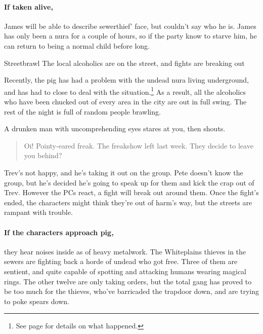 \begin{multicols}{2}

\paragraph{If taken alive,}
James will be able to describe \gls{sewerthief}' face, but couldn't say who he is.
James has only been a nura for a couple of hours, so if the party know to starve him, he can return to being a normal child before long.

{\N Streetbrawl}%
{The local alcoholics are on the street, and fights are breaking out}%

Recently, the \gls{pig} has had a problem with the undead nura living underground, and has had to close to deal with the situation.\footnote{See page \pageref{pig_pantry} for details on what happened.}
As a result, all the alcoholics who have been chucked out of every area in the city are out in full swing.
The rest of the night is full of random people brawling.

\begin{boxtext}

A drunken man with uncomprehending eyes stares at you, then shouts.

\begin{quotation}

	Oi! Pointy-eared freak.  The freakshow left last week.  They decide to leave you behind?

\end{quotation}

\end{boxtext}

Trev's not happy, and he's taking it out on the group.
Pete doesn't know the group, but he's decided he's going to speak up for them and kick the crap out of Trev.
However the PCs react, a fight will break out around them.
Once the fight's ended, the characters might think they're out of harm's way, but the streets are rampant with trouble.


\paragraph{If the characters approach \gls{pig},}
they hear noises inside as of heavy metalwork.
The Whiteplains thieves in the sewers are fighting back a horde of undead who got free.
Three of them are sentient, and quite capable of spotting and attacking humans wearing magical rings.
The other twelve are only taking orders, but the total gang has proved to be too much for the thieves, who've barricaded the trapdoor down, and are trying to poke spears down.


\end{multicols}
